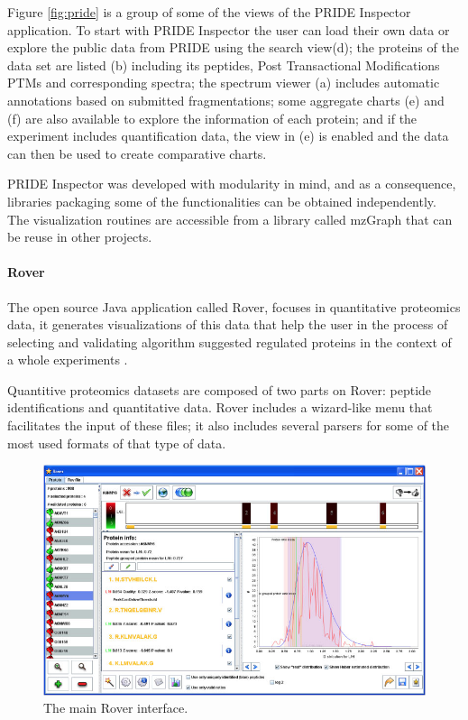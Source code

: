 Figure \ref{fig:pride} is a group of some of the views of the PRIDE Inspector application. To start with PRIDE Inspector the user can load their own data or explore the public data from PRIDE using the search view(d); the proteins of the data set are listed (b) including its peptides, Post Transactional Modifications PTMs and corresponding spectra; the spectrum viewer (a) includes automatic annotations based on submitted fragmentations; some aggregate charts (e) and (f) are also  available to explore the information of each protein; and if the experiment includes quantification data, the view in (e) is enabled and the data can then be used to create comparative charts.

PRIDE Inspector was developed with modularity in mind, and as a consequence, libraries packaging some of the functionalities can be obtained independently. The visualization routines are accessible from a library called mzGraph that can be reuse in other projects.

\paragraph{Rover}
The open source Java application called Rover, focuses in quantitative proteomics data, it generates visualizations of this data that help the user in the process of selecting and validating  algorithm suggested regulated proteins in the context of a whole experiments \cite{PER2014}.

Quantitive proteomics datasets are composed of two parts on Rover: peptide identifications and quantitative data. Rover includes a wizard-like menu that facilitates the input of these files; it also includes several parsers for some of the most used formats of that type of data.

\begin{figure}  
\centering
\includegraphics[width=\textwidth]{figures/rover.png}
\caption[The main Rover interface.]{The main Rover interface.
\label{fig:rover}}
\end{figure}

